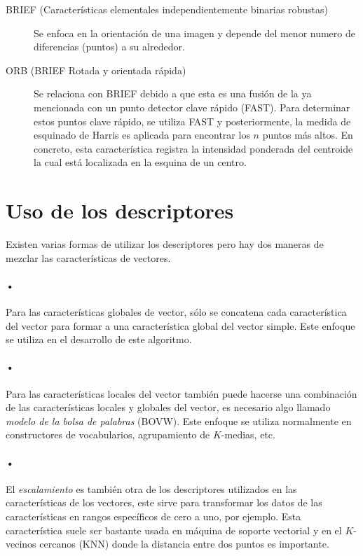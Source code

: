 \begin{description}
\item[BRIEF (Características elementales  independientemente binarias robustas)]{Se enfoca en la orientación de una imagen y depende del menor numero de diferencias (puntos) a su alrededor.}
\end{description}

\begin{description}
\item[ORB (BRIEF Rotada y orientada rápida)]{Se relaciona con BRIEF debido a
que esta es una fusión de la ya mencionada con un punto detector clave rápido (FAST). Para determinar estos puntos clave rápido, se utiliza FAST y posteriormente, la medida de esquinado de Harris es aplicada para encontrar los $n$ puntos más altos. En concreto, esta característica registra la intensidad ponderada del centroide la cual está localizada en la esquina de un centro.}
\end{description}

\section{Uso de los descriptores}
Existen varias formas de utilizar los descriptores pero hay dos maneras de mezclar las características de vectores.

\paragraph{•} Para las características globales de vector, sólo se concatena cada característica del vector para formar a una característica global del vector simple. Este enfoque se utiliza en el desarrollo de este algoritmo.

\paragraph{•} Para las características locales del vector también puede hacerse una combinación de las características locales y globales del vector, es necesario algo llamado \emph{modelo de la bolsa de palabras} (BOVW). Este enfoque se utiliza normalmente en constructores de vocabularios, agrupamiento de $K$-medias, etc.

\paragraph{•} El \emph{escalamiento} es también otra de los descriptores utilizados en las características de los vectores, este sirve para transformar los datos de las características en rangos específicos de cero a uno, por ejemplo. Esta característica suele ser bastante usada en máquina de soporte vectorial y en el $K$-vecinos cercanos (KNN) donde la distancia entre dos puntos es importante.

